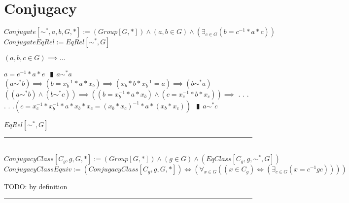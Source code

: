 \documentclass{book}
\newcommand{\abr}{:=}
\newcommand{\cont}{\phantom{.}. . .\phantom{.}}
\newcommand{\pipe}{$\phantom{(}\vrectangleblack\phantom{)}$}
\newcommand{\pr}[1]{\left(#1\right)}
\begin{document}
\section{Conjugacy}
$Conjugate[\sim^*, a, b, G, *] \abr (Group[G, *]) \land (a, b \in G) \land \pr{\exists_{c \in G}(b = c^{-1} * a * c)}$ \\

$ConjugateEqRel \abr EqRel[\sim^*, G]$
\begin{enumerate}
  \lit $(a, b, c \in G) \implies \ldots$
  \begin{enumerate}
    \lit $a = e^{-1} * a * e$ \pipe $a \sim^* a$
    \lit $(a \sim^* b) \implies (b = x_{b}^{-1} * a * x_{b}) \implies (x_{b} * b * x_{b}^{-1} = a) \implies (b \sim^* a)$
    \lit $\pr{(a \sim^* b) \land (b \sim^* c)} \implies \pr{(b = x_{b}^{-1} * a * x_{b}) \land (c = x_{c}^{-1} * b * x_{c})} \implies$ \cont
    \lit \cont $\pr{c = x_{c}^{-1} * x_{b}^{-1} * a * x_{b} * x_{c} = (x_{b} * x_{c})^{-1} * a * (x_{b} * x_{c})}$ \pipe $a \sim^* c$
  \end{enumerate}
  \lit $EqRel[\sim^*, G]$
\end{enumerate} \vspace{.75mm} \hrule \vspace{.75mm} \ \\ 

$ConjugacyClass[C_g, g, G, *] \abr (Group[G, *]) \land (g \in G) \land (EqClass[C_g, g, \sim^*, G])$ \\

$ConjugacyClassEquiv \abr (ConjugacyClass[C_g, g, G, *]) \iff \pr{\forall_{x \in G}\pr{(x \in C_g) \iff \pr{\exists_{c \in G}(x = c^{-1} g c)}}}$
\begin{enumerate}
  \lit TODO: by definition
\end{enumerate} \vspace{.75mm} \hrule \vspace{.75mm} \ \\ 
\end{document}

